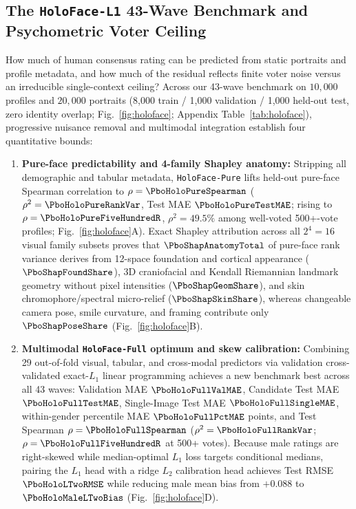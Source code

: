\subsection{The \texorpdfstring{\texttt{HoloFace-L1}}{HoloFace-L1} 43-Wave Benchmark and Psychometric Voter Ceiling}
How much of human consensus rating can be predicted from static portraits and profile metadata, and how much of the residual reflects finite voter noise versus an irreducible single-context ceiling? Across our 43-wave benchmark on $10{,}000$ profiles and $20{,}000$ portraits (8,000 train / 1,000 validation / 1,000 held-out test, zero identity overlap; Fig.~\ref{fig:holoface}; Appendix Table~\ref{tab:holoface}), progressive nuisance removal and multimodal integration establish four quantitative bounds:
\begin{enumerate}[leftmargin=1.4em,itemsep=1.5pt,topsep=2pt]
\item \textbf{Pure-face predictability and 4-family Shapley anatomy:} Stripping all demographic and tabular metadata, \texttt{HoloFace-Pure} lifts held-out pure-face Spearman correlation to $\rho=\PboHoloPureSpearman$ ($\rho^2=\PboHoloPureRankVar$, Test MAE $\PboHoloPureTestMAE$; rising to $\rho=\PboHoloPureFiveHundredR$, $\rho^2=49.5\%$ among well-voted 500+-vote profiles; Fig.~\ref{fig:holoface}A). Exact Shapley attribution across all $2^4=16$ visual family subsets proves that $\PboShapAnatomyTotal$ of pure-face rank variance derives from 12-space foundation and cortical appearance ($\PboShapFoundShare$), 3D craniofacial and Kendall Riemannian landmark geometry without pixel intensities ($\PboShapGeomShare$), and skin chromophore/spectral micro-relief ($\PboShapSkinShare$), whereas changeable camera pose, smile curvature, and framing contribute only $\PboShapPoseShare$ (Fig.~\ref{fig:holoface}B).
\item \textbf{Multimodal \texttt{HoloFace-Full} optimum and skew calibration:} Combining 29 out-of-fold visual, tabular, and cross-modal predictors via validation cross-validated exact-$L_1$ linear programming achieves a new benchmark best across all 43 waves: Validation MAE $\PboHoloFullValMAE$, Candidate Test MAE $\PboHoloFullTestMAE$, Single-Image Test MAE $\PboHoloFullSingleMAE$, within-gender percentile MAE $\PboHoloFullPctMAE$ points, and Test Spearman $\rho=\PboHoloFullSpearman$ ($\rho^2=\PboHoloFullRankVar$; $\rho=\PboHoloFullFiveHundredR$ at 500+ votes). Because male ratings are right-skewed while median-optimal $L_1$ loss targets conditional medians, pairing the $L_1$ head with a ridge $L_2$ calibration head achieves Test RMSE $\PboHoloLTwoRMSE$ while reducing male mean bias from $+0.088$ to $\PboHoloMaleLTwoBias$ (Fig.~\ref{fig:holoface}D).

\end{enumerate}
